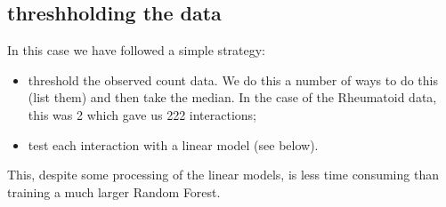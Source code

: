 \documentclass[authoryear,preprint,12pt,3p]{elsarticle}
\begin{document}
\subsection{threshholding the data}
In this case we have followed a simple strategy:
\begin{itemize}
\item threshold the observed count data. We do this a number of ways to do this (list them) and then take the median. In
  the case of the Rheumatoid data, this was 2 which gave us 222 interactions;
\item test each interaction with a linear model (see below).
\end{itemize}

This, despite some processing of the linear models, is less time consuming than training a much larger Random Forest.
\end{document}
